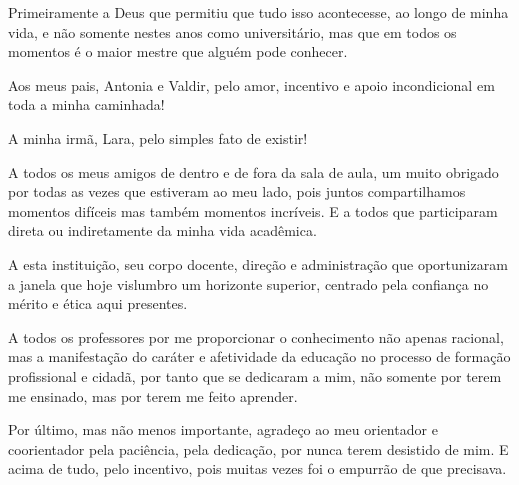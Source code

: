 Primeiramente a Deus que permitiu que tudo isso acontecesse, ao longo de minha vida, e não somente nestes anos como universitário, mas que em todos os momentos é o maior mestre que alguém pode conhecer.

Aos meus pais, Antonia e Valdir, pelo amor, incentivo e apoio incondicional em toda a minha caminhada!

A minha irmã, Lara, pelo simples fato de existir!

A todos os meus amigos de dentro e de fora da sala de aula, um muito obrigado por todas as vezes que estiveram ao meu lado, pois juntos compartilhamos momentos difíceis mas também momentos incríveis. E a todos que participaram direta ou indiretamente da minha vida acadêmica.

A esta instituição, seu corpo docente, direção e administração que oportunizaram a janela que hoje vislumbro um horizonte superior, centrado pela confiança no mérito e ética aqui presentes.

A todos os professores por me proporcionar o conhecimento não apenas racional, mas a manifestação do caráter e afetividade da educação no processo de formação profissional e cidadã, por tanto que se dedicaram a mim, não somente por terem me ensinado, mas por terem me feito aprender.

Por último, mas não menos importante, agradeço ao meu orientador e coorientador pela paciência, pela dedicação, por nunca terem desistido de mim. E acima de tudo, pelo incentivo, pois muitas vezes foi o empurrão de que precisava.